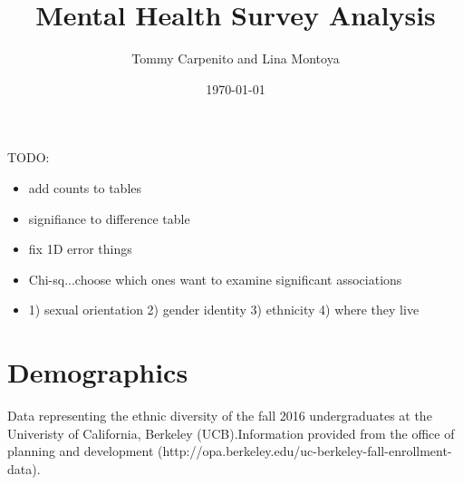 \documentclass{article}\usepackage[]{graphicx}\usepackage[]{color}
\title{Mental Health Survey Analysis}
\author{Tommy Carpenito and Lina Montoya}
\date{\today}
\begin{document}
\maketitle
\tableofcontents

\pagebreak

TODO:

\begin{itemize}
\item add counts to tables
\item signifiance to difference table
\item fix 1D error things
\item Chi-sq...choose which ones want to examine significant associations
\item 1) sexual orientation 2) gender identity 3) ethnicity 4) where they live
\end{itemize}

\section{Demographics}
 Data representing the ethnic diversity of the fall 2016 undergraduates at the Univeristy of California, Berkeley (UCB).Information provided from the office of planning and development  (http://opa.berkeley.edu/uc-berkeley-fall-enrollment-data).
\end{document}
